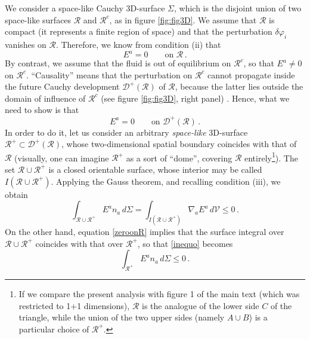 \documentclass[aps,prl,reprint,nofootinbib]{revtex4-1}
\begin{document}
We consider a space-like Cauchy 3D-surface $\Sigma$, which is the disjoint union of two space-like surfaces $\mathcal{R}$ and $\mathcal{R}^c$, as in figure \ref{fig:fig3D}. We assume that $\mathcal{R}$ is compact (it represents a finite region of space) and that the perturbation $\delta \varphi_i$ vanishes on $\mathcal{R}$. Therefore, we know from condition (ii) that
\begin{equation}\label{zeroonR}
E^a =0 \quad \quad \text{on }\mathcal{R} \, .
\end{equation}
By contrast, we assume that the fluid is out of equilibrium on $\mathcal{R}^c$, so that $E^a \neq 0$ on $\mathcal{R}^c$. ``Causality'' means that the perturbation on $\mathcal{R}^c$ cannot propagate inside the future Cauchy development $\mathcal{D}^+(\mathcal{R})$ of $\mathcal{R}$, because the latter lies outside the domain of influence of $\mathcal{R}^c$ (see figure \ref{fig:fig3D}, right panel) \cite{Hawking1973}. Hence, what we need to show is that
\begin{equation}\label{goaAAAAAAAAAAll}
E^a =0 \quad \quad \text{on }\mathcal{D}^+(\mathcal{R}) \, .
\end{equation} 
In order to do it, let us consider an arbitrary \textit{space-like} 3D-surface $\mathcal{R}^+ \subset \mathcal{D}^+(\mathcal{R})$, whose two-dimensional spatial boundary coincides with that of $\mathcal{R}$ (visually, one can imagine $\mathcal{R}^+$ as a sort of ``dome'', covering $\mathcal{R}$ entirely\footnote{If we compare the present analysis with figure 1 of the main text (which was restricted to 1+1 dimensions), $\mathcal{R}$ is the analogue of the lower side $C$ of the triangle, while the union of the two upper sides (namely $A \cup B$) is a particular choice of $\mathcal{R}^+$.}). The set $\mathcal{R} \cup \mathcal{R}^+$ is a closed orientable surface, whose interior may be called $I(\mathcal{R} \cup \mathcal{R}^+)$. Applying the Gauss theorem, and recalling condition (iii), we obtain
\begin{equation}\label{inequo}
\int_{\mathcal{R} \cup \mathcal{R}^+} \!\!\!\!\!\!\!\!\! E^a n_a \, d\Sigma = \int_{I(\mathcal{R} \cup \mathcal{R}^+)} \!\!\!\!\!\!\!\!\!\!\!\!\! \nabla_a E^a \, d\mathcal{V} \leq 0 \, .
\end{equation}
On the other hand, equation \eqref{zeroonR} implies that the surface integral over $\mathcal{R} \cup \mathcal{R}^+$ coincides with that over $\mathcal{R}^+$, so that \eqref{inequo} becomes
\begin{equation}\label{leSecunda}
\int_{\mathcal{R}^+ }  E^a n_a \, d\Sigma  \leq 0 \, .
\end{equation}
\end{document}

